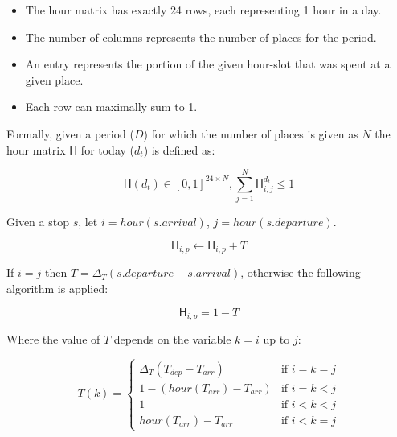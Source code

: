\begin{itemize}
    \item The hour matrix has exactly 24 rows, each representing 1 hour in a day.
    \item The number of columns represents the number of places for the period. 
    \item An entry represents the portion of the given hour-slot that was spent at a given place.
    \item Each row can maximally sum to 1.
\end{itemize}

Formally, given a period ($D$) for which the number of places is given as $N$ the hour matrix $\mathsf{H}$ for today ($d_t$) is defined as:

\begin{equation}
\label{eq:feature-hour-matrix-def}
\mathsf{H}(d_t) \in [0,1]^{24 \times N}, \sum_{j=1}^N \mathsf{H}^{d_t}_{i,j} \leq 1
\end{equation}

Given a stop $s$, let $i = hour(s.arrival)$, $j = hour(s.departure)$.

\begin{equation}
\label{eq:feature-hour-matrix-computation}
\mathsf{H}_{i,p} \leftarrow \mathsf{H}_{i,p} + T
\end{equation}

If $i = j$ then $T = \Delta_T (s.departure - s.arrival)$, otherwise the following algorithm is applied:

\begin{equation}
\label{eq:feature-hour-computaion2}
\mathsf{H}_{i,p} = 1 - T
\end{equation}

Where the value of $T$ depends on the variable $k = i$ up to $j$:

\begin{equation}
\label{eq:feature-hour-computaion3}
T(k) =
\begin{cases}
    \Delta_T (T_{dep} - T_{arr})    & \text{if $i = k = j$} \\
    1 - (hour(T_{arr}) - T_{arr})   & \text{if $i = k < j$} \\
    1                               & \text{if $i < k < j$} \\
    hour(T_{arr}) - T_{arr}         & \text{if $i < k = j$}
\end{cases}
\end{equation}


